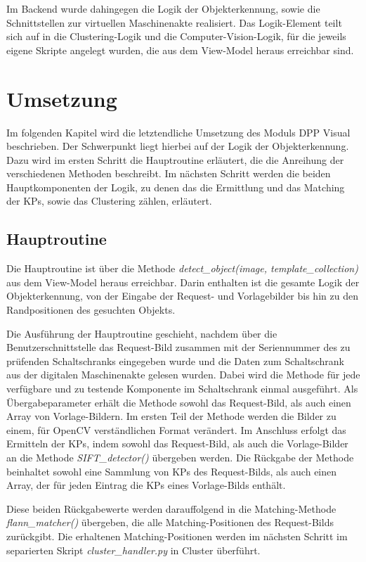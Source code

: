\documentclass[
    type=Prakikumsbericht,
    status=draft, %
    language=german, %
    bibengine=bibtex,
]{unibwm-inf-thesis}
\begin{document}
    Im Backend wurde dahingegen die Logik der Objekterkennung, sowie die Schnittstellen zur virtuellen Maschinenakte realisiert.
    Das Logik-Element teilt sich auf in die Clustering-Logik und die Computer-Vision-Logik, für die jeweils eigene
    Skripte angelegt wurden, die aus dem View-Model heraus erreichbar sind.

    \section{Umsetzung}
    Im folgenden Kapitel wird die letztendliche Umsetzung des Moduls \ac{DPP} Visual beschrieben.
    Der Schwerpunkt liegt hierbei auf der Logik der Objekterkennung.
    Dazu wird im ersten Schritt die Hauptroutine erläutert, die die Anreihung der verschiedenen Methoden beschreibt.
    Im nächsten Schritt werden die beiden Hauptkomponenten der Logik, zu denen das die Ermittlung und das Matching der \acp{KP}, sowie das Clustering zählen, erläutert.

    \subsection{Hauptroutine}
    Die Hauptroutine ist über die Methode \textit{detect\_object(image, template\_collection)} aus dem View-Model heraus erreichbar.
    Darin enthalten ist die gesamte Logik der Objekterkennung, von der Eingabe der Request- und Vorlagebilder bis hin zu den Randpositionen des gesuchten Objekts.

    Die Ausführung der Hauptroutine geschieht, nachdem über die Benutzerschnittstelle das Request-Bild zusammen mit der Seriennummer des zu prüfenden Schaltschranks eingegeben wurde und die Daten zum Schaltschrank aus der digitalen Maschinenakte gelesen wurden.
    Dabei wird die Methode für jede verfügbare und zu testende Komponente im Schaltschrank einmal ausgeführt.
    Als Übergabeparameter erhält die Methode sowohl das Request-Bild, als auch einen Array von Vorlage-Bildern.
    Im ersten Teil der Methode werden die Bilder zu einem, für OpenCV verständlichen Format verändert.
    Im Anschluss erfolgt das Ermitteln der \acp{KP}, indem sowohl das Request-Bild, als auch die Vorlage-Bilder an die Methode \textit{SIFT\_detector()} übergeben werden.
    Die Rückgabe der Methode beinhaltet sowohl eine Sammlung von \acp{KP} des Request-Bilds, als auch einen Array, der für jeden Eintrag die \acp{KP} eines Vorlage-Bilds enthält.

    Diese beiden Rückgabewerte werden darauffolgend in die Matching-Methode \textit{flann\_matcher()} übergeben, die alle Matching-Positionen des Request-Bilds zurückgibt.
    Die erhaltenen Matching-Positionen werden im nächsten Schritt im separierten Skript \textit{cluster\_handler.py} in Cluster überführt.
\end{document}
